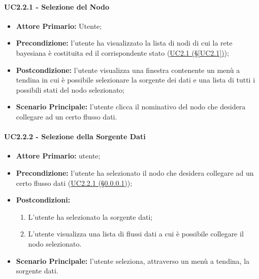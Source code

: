\paragraph{UC2.2.1 - Selezione del Nodo}\label{UC2.2.1}
\begin{itemize}
\item \textbf{Attore Primario:} Utente;
\item \textbf{Precondizione:} l'utente ha visualizzato la lista di nodi di cui la rete bayesiana è costituita ed il 	corrispondente stato (\hyperref[UC2.1]{UC2.1 (§\ref*{UC2.1})});
\item \textbf{Postcondizione:} l'utente visualizza una finestra contenente un menù a tendina in cui è possibile selezionare la sorgente dei dati e una lista di tutti i possibili stati del nodo selezionato;
\item \textbf{Scenario Principale:} l'utente clicca il nominativo del nodo che desidera collegare ad un certo flusso dati.
\end{itemize}

\paragraph{UC2.2.2 - Selezione della Sorgente Dati}\label{UC2.2.2}
\begin{itemize}
\item \textbf{Attore Primario:} utente;
\item \textbf{Precondizione:} l'utente ha selezionato il nodo che desidera collegare ad un certo flusso dati 					(\hyperref[UC2.2.1]{UC2.2.1 (§\ref*{UC2.2.1})});
\item \textbf{Postcondizioni:} 
	\begin{enumerate}
	\item L'utente ha selezionato la sorgente dati;
	\item L'utente visualizza una lista di flussi dati a cui è possibile 	collegare il nodo selezionato.
	\end{enumerate}
\item \textbf{Scenario Principale:} l'utente seleziona, attraverso un menù a tendina, la sorgente dati.
\end{itemize}

